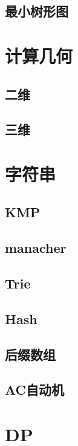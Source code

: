 \documentclass{article}
\begin{document}
\subsection{最小树形图}

\section{计算几何}
\subsection{二维}

\subsection{三维}

\section{字符串}
\subsection{KMP}

\subsection{manacher}

\subsection{Trie}

\subsection{Hash}

\subsection{后缀数组}

\subsection{AC自动机}


\section{DP}
\end{document}
